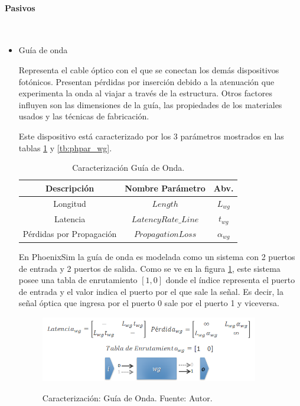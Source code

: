 \paragraph{Pasivos}~\\
\begin{itemize}
\item Guía de onda

Representa el cable óptico con el que se conectan los demás dispositivos fotónicos. 
Presentan pérdidas por inserción debido a la atenuación que experimenta la onda
al viajar a través de la estructura. Otros factores influyen son 
las dimensiones de la guía, las propiedades de los materiales usados y las técnicas
de fabricación.

Este dispositivo está caracterizado por los 3 parámetros  mostrados en 
las tablas \ref{tb:wg_params} y \ref{tb:phpar_wg}.

\begin{table}[H]
\centering
\begin{tabular}{|c|c|c|}
\hline
Descripción &  Nombre Parámetro & Abv. \\
\hline
Longitud & $Length$ & $L_{wg}$ \\
Latencia & $LatencyRate\_Line$ & $t_{wg}$ \\
Pérdidas por Propagación & $PropagationLoss$ & $\alpha_{wg}$ \\
\hline
\end{tabular}
\caption{Caracterización Guía de Onda.}
\label{tb:wg_params}
\end{table} 

En PhoenixSim la guía de onda es modelada como un sistema con 2 puertos de entrada
y 2 puertos de salida. Como se ve en la figura \ref{fig:phoenix_wg}, este sistema
posee una tabla de enrutamiento $[1,0]$ donde el índice representa el puerto de entrada
y el valor indica el puerto por el que sale la señal. Es decir, la señal óptica que ingresa
por el puerto 0 sale por el puerto 1 y viceversa. \cite{Chan2011}

\begin{figure}[H]
\caption{Caracterización: Guía de Onda. Fuente: Autor.}
\centering
\includegraphics[width=0.9\textwidth,natwidth=665,natheight=200]{figs/wg.png}
\label{fig:phoenix_wg}
\end{figure}


\end{itemize}
